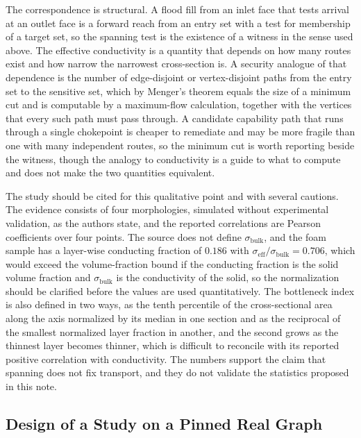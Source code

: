 \documentclass[11pt]{article}
\begin{document}
The correspondence is structural. A flood fill from an inlet face that tests arrival at an outlet face is a forward reach from an entry set with a test for membership of a target set, so the spanning test is the existence of a witness in the sense used above. The effective conductivity is a quantity that depends on how many routes exist and how narrow the narrowest cross-section is. A security analogue of that dependence is the number of edge-disjoint or vertex-disjoint paths from the entry set to the sensitive set, which by Menger's theorem equals the size of a minimum cut and is computable by a maximum-flow calculation, together with the vertices that every such path must pass through. A candidate capability path that runs through a single chokepoint is cheaper to remediate and may be more fragile than one with many independent routes, so the minimum cut is worth reporting beside the witness, though the analogy to conductivity is a guide to what to compute and does not make the two quantities equivalent.

The study should be cited for this qualitative point and with several cautions. The evidence consists of four morphologies, simulated without experimental validation, as the authors state, and the reported correlations are Pearson coefficients over four points. The source does not define $\sigma_{\mathrm{bulk}}$, and the foam sample has a layer-wise conducting fraction of $0.186$ with $\sigma_{\mathrm{eff}}/\sigma_{\mathrm{bulk}}=0.706$, which would exceed the volume-fraction bound if the conducting fraction is the solid volume fraction and $\sigma_{\mathrm{bulk}}$ is the conductivity of the solid, so the normalization should be clarified before the values are used quantitatively. The bottleneck index is also defined in two ways, as the tenth percentile of the cross-sectional area along the axis normalized by its median in one section and as the reciprocal of the smallest normalized layer fraction in another, and the second grows as the thinnest layer becomes thinner, which is difficult to reconcile with its reported positive correlation with conductivity. The numbers support the claim that spanning does not fix transport, and they do not validate the statistics proposed in this note.

\subsection{Design of a Study on a Pinned Real Graph}
\end{document}
